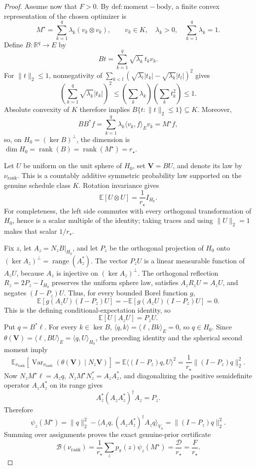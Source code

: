 \documentclass{article}
\begin{document}
\begin{proof}
Assume now that \(F>0\). By \(\mathrm{def:moment-body}\), a finite convex representation of the chosen optimizer is
\[
 M^{\star}=\sum_{k=1}^q\lambda_k(v_k\otimes v_k),
 \qquad
 v_k\in K,\quad \lambda_k>0,\quad \sum_{k=1}^q\lambda_k=1.
\]
Define \(B:\mathbb R^q\to E\) by
\[
 Bt=\sum_{k=1}^q\sqrt{\lambda_k}\,t_kv_k.
\]
For \(\|t\|_2\le1\), nonnegativity of
\(\sum_{k<l}(\sqrt{\lambda_l}|t_k|-\sqrt{\lambda_k}|t_l|)^2\)
gives
\[
 \left(\sum_{k=1}^q\sqrt{\lambda_k}|t_k|\right)^2
 \le\left(\sum_k\lambda_k\right)\left(\sum_kt_k^2\right)
 \le1.
\]
Absolute convexity of \(K\) therefore implies \(B\{t:\|t\|_2\le1\}\subseteq K\). Moreover,
\[
 BB^{\ast}f
 =\sum_{k=1}^q\lambda_k\langle v_k,f\rangle_Ev_k
 =M^{\star}f,
\]
so, on \(H_0=(\ker B)^{\perp}\), the dimension is
\(
\dim H_0=\operatorname{rank}(B)=\operatorname{rank}(M^{\star})=r_{\star}
\).

Let \(U\) be uniform on the unit sphere of \(H_0\), set \(\mathbf V=BU\), and denote its law by \(\nu_{\mathrm{rank}}\). This is a countably additive symmetric probability law supported on the genuine schedule class \(K\). Rotation invariance gives
\[
 \mathbb E[U\otimes U]=\frac1{r_{\star}}I_{H_0}.
\]
For completeness, the left side commutes with every orthogonal transformation of \(H_0\), hence is a scalar multiple of the identity; taking traces and using \(\|U\|_2=1\) makes that scalar \(1/r_{\star}\).

Fix \(z\), let \(A_z=N_zB|_{H_0}\), and let \(P_z\) be the orthogonal projection of \(H_0\) onto \((\ker A_z)^{\perp}=\operatorname{range}(A_z^{\ast})\). The vector \(P_zU\) is a linear measurable function of \(A_zU\), because \(A_z\) is injective on \((\ker A_z)^{\perp}\). The orthogonal reflection \(R_z=2P_z-I_{H_0}\) preserves the uniform sphere law, satisfies \(A_zR_zU=A_zU\), and negates \((I-P_z)U\). Thus, for every bounded Borel function \(g\),
\[
 \mathbb E\!\left[g(A_zU)(I-P_z)U\right]
 =-\mathbb E\!\left[g(A_zU)(I-P_z)U\right]=0.
\]
This is the defining conditional-expectation identity, so
\[
 \mathbb E[U\mid A_zU]=P_zU.
\]
Put \(q=B^{\ast}\ell\). For every \(k\in\ker B\), \(\langle q,k\rangle=\langle\ell,Bk\rangle_E=0\), so \(q\in H_0\). Since
\(
\theta(\mathbf V)=\langle\ell,BU\rangle_E=\langle q,U\rangle_{H_0}
\), the preceding identity and the spherical second moment imply
\[
 \mathbb E_{\nu_{\mathrm{rank}}}
 \!\left[\operatorname{Var}_{\nu_{\mathrm{rank}}}
 \!\left(\theta(\mathbf V)\mid N_z\mathbf V\right)\right]
 =\mathbb E\langle(I-P_z)q,U\rangle^2
 =\frac1{r_{\star}}\|(I-P_z)q\|_2^2.
\]
Now \(N_zM^{\star}\ell=A_zq\), \(N_zM^{\star}N_z^{\ast}=A_zA_z^{\ast}\), and diagonalizing the positive semidefinite operator \(A_zA_z^{\ast}\) on its range gives
\[
 A_z^{\ast}(A_zA_z^{\ast})^{\dagger}A_z=P_z.
\]
Therefore
\[
 \psi_z(M^{\star})
 =\|q\|_2^2-
 \langle A_zq,(A_zA_z^{\ast})^{\dagger}A_zq\rangle_{V_n}
 =\|(I-P_z)q\|_2^2.
\]
Summing over assignments proves the exact genuine-prior certificate
\[
 \mathcal B(\nu_{\mathrm{rank}})
 =\frac1{r_{\star}}\sum_zp_{\pi}(z)\psi_z(M^{\star})
 =\frac{\mathcal D}{r_{\star}}
 =\frac{F}{r_{\star}}.
\]


\end{proof}
\end{document}
